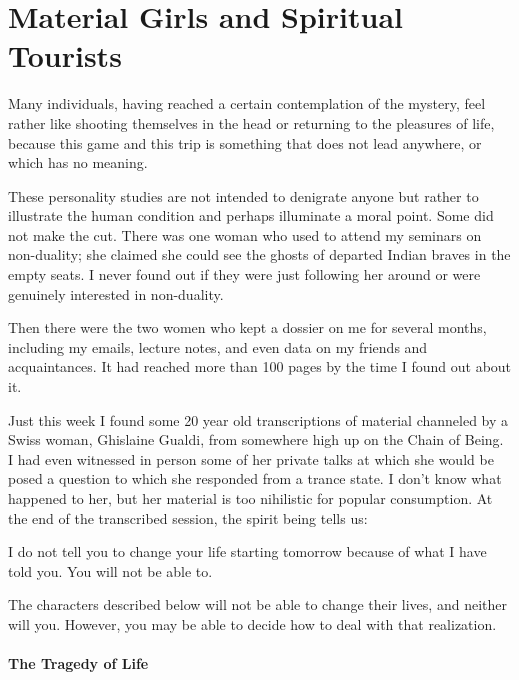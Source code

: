 \section{Material Girls and Spiritual Tourists}

\begin{quotex}
Many individuals, having reached a certain contemplation of the mystery, feel rather like shooting themselves in the head or returning to the pleasures of life, because this game and this trip is something that does not lead anywhere, or which has no meaning.
\end{quotex}


These personality studies are not intended to denigrate anyone but rather to illustrate the human condition and perhaps illuminate a moral point. Some did not make the cut. There was one woman who used to attend my seminars on non-duality; she claimed she could see the ghosts of departed Indian braves in the empty seats. I never found out if they were just following her around or were genuinely interested in non-duality.

Then there were the two women who kept a dossier on me for several months, including my emails, lecture notes, and even data on my friends and acquaintances. It had reached more than 100 pages by the time I found out about it.

Just this week I found some 20 year old transcriptions of material channeled by a Swiss woman, Ghislaine Gualdi, from somewhere high up on the Chain of Being. I had even witnessed in person some of her private talks at which she would be posed a question to which she responded from a trance state. I don't know what happened to her, but her material is too nihilistic for popular consumption. At the end of the transcribed session, the spirit being tells us:

\begin{quotex}
I do not tell you to change your life starting tomorrow because of what I have told you. You will not be able to.
\end{quotex}


The characters described below will not be able to change their lives, and neither will you. However, you may be able to decide how to deal with that realization.

\paragraph{The Tragedy of Life}


